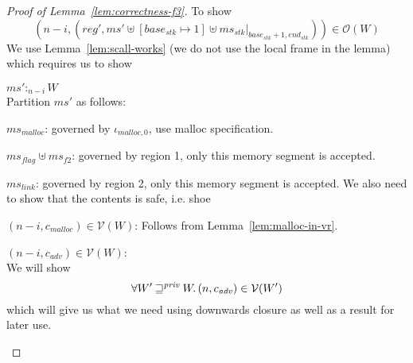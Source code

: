 \documentclass[a4paper]{article}
\newcommand{\var}[1]{\mathit{#1}}
\newcommand{\hs}{\var{ms}}
\newcommand{\ms}{\hs}
\newcommand{\start}{\var{base}}
\newcommand{\addrend}{\var{end}}
\newcommand{\reg}{\var{reg}}
\newcommand{\heap}{\var{mem}}
\newcommand{\adv}{\var{adv}}
\newcommand{\link}{\var{link}}
\newcommand{\stk}{\var{stk}}
\newcommand{\flag}{\var{flag}}
\newcommand{\futurestr}{\mathbin{\sqsupseteq}^{\var{priv}}}
\newcommand{\heapSat}[3][\heap]{#1 :_{#2} #3}
\newcommand{\memSat}[3][n]{\heapSat[#2]{#1}{#3}}
\newcommand{\codelabel}[1]{\mathit{#1}}
\newcommand{\malloc}{\codelabel{malloc}}
\newcommand{\asmType}{\plaindom{AsmType}}
\newcommand{\plaindom}[1]{\mathrm{#1}}
\newcommand{\intr}[2]{\mathcal{#1}}
\newcommand{\valueintr}[1]{\intr{V}{#1}}
\newcommand{\stdvr}{\valueintr{\asmType}}
\newcommand{\observations}{\mathcal{O}}
\newcommand{\npair}[2][n]{\left(#1,#2 \right)}
\begin{document}
\begin{proof}[Proof of Lemma~\ref{lem:correctness-f3}]
To show
\[
  \npair[n-i]{(\reg',\ms' \uplus [\start_\stk \mapsto 1] \uplus \ms_\stk |_{\start_\stk+1,\addrend_\stk})} \in \observations(W)
\]
We use Lemma~\ref{lem:scall-works} (we do not use the local frame in the lemma) which requires us to show
\begin{enumproof}
  \item $\memSat[n-i]{\ms'}{W}$ \\
    Partition $\ms'$ as follows:
    \begin{enumproof}
      \item $\ms_\malloc$: governed by $\iota_{\malloc,0}$, use malloc specification.
      \item $\ms_\flag \uplus \ms_{f2}$: governed by region 1, only this memory segment is accepted.
      \item $\ms_\link$: governed by region 2, only this memory segment is accepted. We also need to show that the contents is safe, i.e. shoe
        \begin{enumproof}
          \item $\npair[n-i]{c_\malloc} \in \stdvr(W)$: Follows from Lemma~\ref{lem:malloc-in-vr}.
          \item $\npair[n-i]{c_\adv} \in \stdvr(W)$: \\
            We will show
            \begin{equation}
              \label{eq:f3:adv-in-stder}
              \forall W' \futurestr W \ldotp \npair{c_\adv} \in \stdvr(W')
            \end{equation}
            which will give us what we need using downwards closure as well as a result for later use.


\end{enumproof}
\end{enumproof}
\end{enumproof}
\end{proof}
\end{document}
